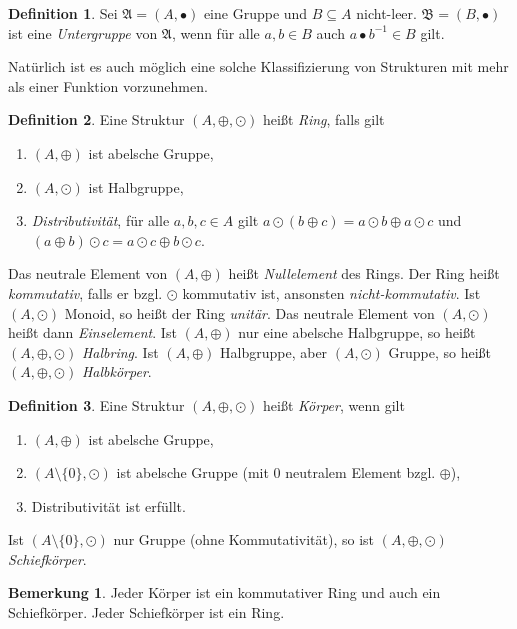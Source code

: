 \documentclass[11pt, a4paper]{article}
\theoremstyle{definition}
\newtheorem{definition}{Definition}[section]
\newtheorem*{remark*}{Bemerkung}
\theoremstyle{plain}
\numberwithin{equation}{section}
\begin{document}
\begin{definition}
	Sei $\mathfrak{A} = (A, \bullet)$ eine Gruppe und $B \subseteq A$ nicht-leer. $\mathfrak{B} = (B, \bullet)$ ist eine \textit{Untergruppe} von $\mathfrak{A}$, wenn für alle $a, b \in B$ auch $a \bullet b^{-1} \in B$ gilt.
\end{definition}
Natürlich ist es auch möglich eine solche Klassifizierung von Strukturen mit mehr als einer Funktion vorzunehmen.
\begin{definition}
	Eine Struktur $(A, \oplus, \odot)$ heißt \textit{Ring}, falls gilt
	\begin{enumerate}
		\item $(A, \oplus)$ ist abelsche Gruppe,
		\item $(A, \odot)$ ist Halbgruppe,
		\item \textit{Distributivität}, für alle $a, b, c \in A$ gilt $a \odot (b \oplus c) = a \odot b \oplus a \odot c$ und $(a \oplus b) \odot c = a \odot c \oplus b \odot c$.
	\end{enumerate}
	Das neutrale Element von $(A, \oplus)$ heißt \textit{Nullelement} des Rings. Der Ring heißt \textit{kommutativ}, falls er bzgl. $\odot$ kommutativ ist, ansonsten \textit{nicht-kommutativ}. Ist $(A, \odot)$ Monoid, so heißt der Ring \textit{unitär}. Das neutrale Element von $(A, \odot)$ heißt dann \textit{Einselement}. Ist $(A, \oplus)$ nur eine abelsche Halbgruppe, so heißt $(A, \oplus, \odot)$ \textit{Halbring}. Ist $( A, \oplus)$ Halbgruppe, aber $(A, \odot)$ Gruppe, so heißt $(A, \oplus, \odot)$ \textit{Halbkörper}.
\end{definition}
\begin{definition}
	Eine Struktur $(A, \oplus, \odot)$ heißt \textit{Körper}, wenn gilt
	\begin{enumerate}
		\item $(A, \oplus)$ ist abelsche Gruppe,
		\item $(A \setminus \{0\}, \odot)$ ist abelsche Gruppe (mit $0$ neutralem Element bzgl. $\oplus$),
		\item Distributivität ist erfüllt.
	\end{enumerate}
	Ist $(A \setminus \{0\}, \odot)$ nur Gruppe (ohne Kommutativität), so ist $(A, \oplus, \odot)$ \textit{Schiefkörper}.
\end{definition}
\begin{remark*}
	Jeder Körper ist ein kommutativer Ring und auch ein Schiefkörper. Jeder Schiefkörper ist ein Ring.
\end{remark*}
\end{document}

